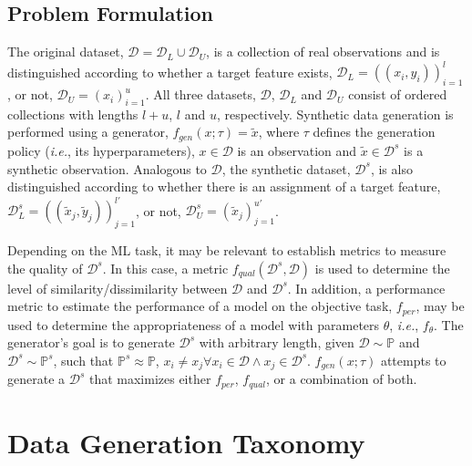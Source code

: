 \documentclass[parskip=full]{scrartcl}
\begin{document}

\subsection{Problem Formulation}\label{sec:problem-formulation}

The original dataset, $\mathcal{D} = \mathcal{D}_L \cup \mathcal{D}_U$,
is a collection of real observations and is distinguished according to whether
a target feature exists, $\mathcal{D}_L = {((x_i, y_i))}^l_{i=1}$, or not,
$\mathcal{D}_U = {(x_i)}^{u}_{i=1}$. All three datasets, $\mathcal{D}$,
$\mathcal{D}_L$ and $\mathcal{D}_U$ consist of ordered collections with
lengths $l+u$, $l$ and $u$, respectively. Synthetic data generation is
performed using a generator, $f_{gen}(x;\tau) = \tilde{x}$, where $\tau$
defines the generation policy (\textit{i.e.}, its hyperparameters), $x \in
\mathcal{D}$ is an observation and $\tilde{x} \in \mathcal{D}^s$ is a
synthetic observation. Analogous to $\mathcal{D}$, the synthetic dataset,
$\mathcal{D}^s$, is also distinguished according to whether there is an
assignment of a target feature, $\mathcal{D}^s_L = {((\tilde{x}_j,
\tilde{y}_j))}^{l'}_{j=1}$, or not, $\mathcal{D}^s_U =
{(\tilde{x}_j)}^{u'}_{j=1}$.

Depending on the ML task, it may be relevant to establish metrics to measure
the quality of $\mathcal{D}^s$. In this case, a metric
$f_{qual}(\mathcal{D}^s, \mathcal{D})$ is used to determine the level of
similarity/dissimilarity between $\mathcal{D}$ and $\mathcal{D}^s$. In
addition, a performance metric to estimate the performance of a model on the
objective task, $f_{per}$, may be used to determine the appropriateness of a
model with parameters $\theta$, \textit{i.e.}, $f_{\theta}$. The generator's
goal is to generate $\mathcal{D}^s$ with arbitrary length, given
$\mathcal{D} \sim \mathbb{P}$ and $\mathcal{D}^s \sim \mathbb{P}^s$, such
that $\mathbb{P}^s \approx \mathbb{P}$, $x_i \neq x_j \forall x_i \in
\mathcal{D} \wedge x_j \in \mathcal{D}^s$. $f_{gen}(x;\tau)$ attempts to
generate a $\mathcal{D}^s$ that maximizes either $f_{per}$, $f_{qual}$, or a
combination of both.


\section{Data Generation Taxonomy}\label{sec:taxonomy}
\end{document}
